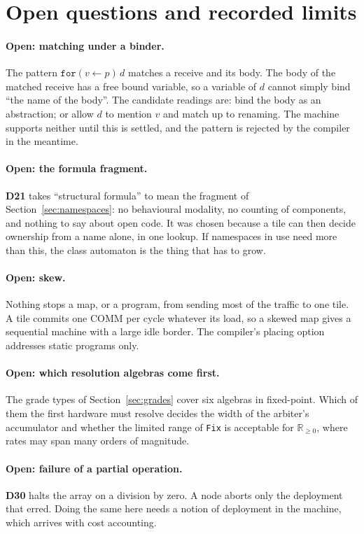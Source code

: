 \documentclass[11pt]{article}
\newcommand{\kw}[1]{\texttt{#1}}
\newcommand{\for}[3]{\kw{for}(#1 \leftarrow #2)\,#3}
\newcommand{\dec}[1]{\textbf{D#1}}
\theoremstyle{definition}
\theoremstyle{remark}
\begin{document}
\section{Open questions and recorded limits}\label{sec:open}

\paragraph{Open: matching under a binder.}
The pattern $\for{v}{p}{d}$ matches a receive and its body. The body of the
matched receive has a free bound variable, so a variable of $d$ cannot simply
bind ``the name of the body''. The candidate readings are: bind the body as
an abstraction; or allow $d$ to mention $v$ and match up to renaming. The
machine supports neither until this is settled, and the pattern is rejected
by the compiler in the meantime.

\paragraph{Open: the formula fragment.} \dec{21} takes ``structural
formula'' to mean the fragment of Section~\ref{sec:namespaces}: no
behavioural modality, no counting of components, and nothing to say about
open code. It was chosen because a tile can then decide ownership from a name
alone, in one lookup. If namespaces in use need more than this, the class
automaton is the thing that has to grow.

\paragraph{Open: skew.} Nothing stops a map, or a program, from sending most
of the traffic to one tile. A tile commits one COMM per cycle whatever its
load, so a skewed map gives a sequential machine with a large idle border.
The compiler's placing option addresses static programs only.

\paragraph{Open: which resolution algebras come first.} The grade types of
Section~\ref{sec:grades} cover six algebras in fixed-point. Which of them
the first hardware must resolve decides the width of the arbiter's
accumulator and whether the limited range of \kw{Fix} is acceptable for
$\mathbb{R}_{\ge 0}$, where rates may span many orders of magnitude.

\paragraph{Open: failure of a partial operation.} \dec{30} halts the array on
a division by zero. A node aborts only the deployment that erred. Doing the
same here needs a notion of deployment in the machine, which arrives with
cost accounting.
\end{document}

